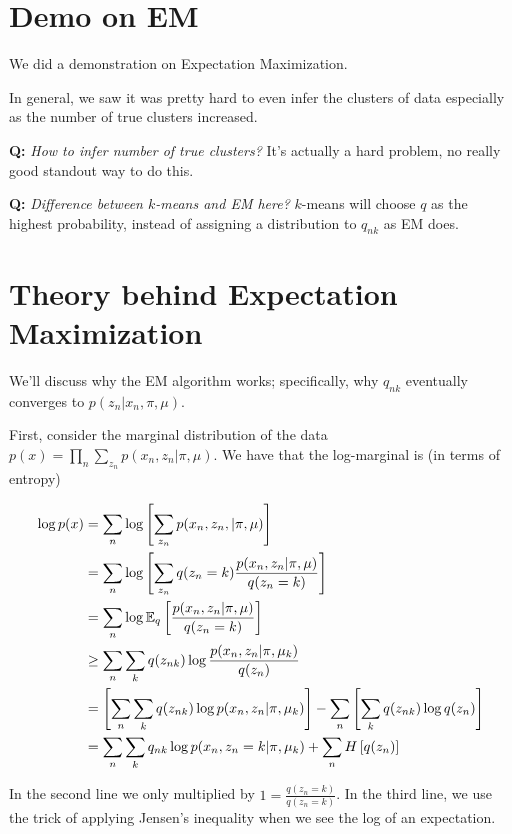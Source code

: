 \documentclass{article}
\begin{document}
\section{Demo on EM}

We did a demonstration on Expectation Maximization.

In general, we saw it was pretty hard to even infer the clusters of data especially as the number of true clusters increased. 

{\bf Q:} \emph{How to infer number of true clusters?}  It's actually a hard problem, no really good standout way to do this.

{\bf Q:} \emph{Difference between $k$-means and EM here?}  $k$-means will choose $q$ as the highest probability, instead of assigning a distribution to $q_{nk}$ as EM does.


\section{Theory behind Expectation Maximization}

We'll discuss why the EM algorithm works; specifically, why $q_{nk}$ eventually converges to  $p(z_n | x_n, \pi, \mu)$.

First, consider the marginal distribution of the data $\displaystyle p(x) = \prod_n \sum_{z_n} p(x_n, z_n | \pi, \mu)$. We have that the log-marginal is (in terms of entropy) 

\begin{align*}
\log p(x) &= \sum_n \log \left[\sum_{z_n} p(x_n, z_n, | \pi, \mu) \right]\\
&= \sum_n \log \left[ \sum_{z_n} q(z_n = k) \frac{p(x_n, z_n|\pi, \mu)}{q (z_n = k)} \right] \\
&= \sum_n \log \mathbb{E}_q \left[ \frac{p(x_n, z_n | \pi, \mu)}{q(z_n = k)}   \right] \\
&\ge \sum_n \sum_k q(z_{nk}) \log \frac{p(x_n, z_n |\pi, \mu_k)}{q(z_n)} \\
&= \left[\sum_n \sum_k q(z_{nk}) \log p(x_n, z_n |\pi, \mu_k) \right]- \sum_n \left[\sum_k q(z_{nk}) \log q(z_n)\right] \\
&= \sum_n \sum_k q_{nk} \log p(x_n, z_n = k | \pi, \mu_k) + \sum_n H\left[ q(z_n)\right]
\end{align*}

In the second line we only multiplied by $\displaystyle 1 = \frac{q(z_n  = k)}{q(z_n = k)}$.  In the third line, we use the trick of applying Jensen's inequality when we see the log of an expectation.
\end{document}
